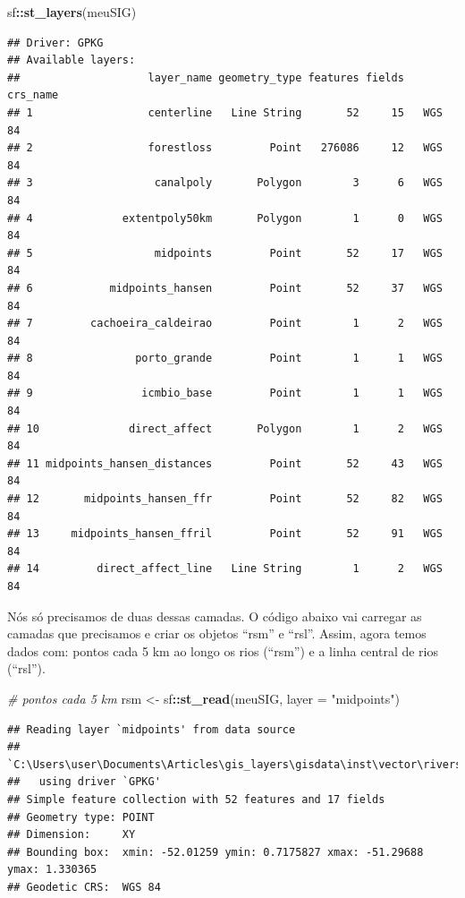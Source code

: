 \documentclass[
]{article}
\newenvironment{Shaded}{\begin{snugshade}}{\end{snugshade}}
\newcommand{\AttributeTok}[1]{\textcolor[rgb]{0.13,0.29,0.53}{#1}}
\newcommand{\CommentTok}[1]{\textcolor[rgb]{0.56,0.35,0.01}{\textit{#1}}}
\newcommand{\FunctionTok}[1]{\textcolor[rgb]{0.13,0.29,0.53}{\textbf{#1}}}
\newcommand{\NormalTok}[1]{#1}
\newcommand{\OtherTok}[1]{\textcolor[rgb]{0.56,0.35,0.01}{#1}}
\newcommand{\SpecialCharTok}[1]{\textcolor[rgb]{0.81,0.36,0.00}{\textbf{#1}}}
\newcommand{\StringTok}[1]{\textcolor[rgb]{0.31,0.60,0.02}{#1}}
\begin{document}
\begin{Shaded}
\begin{Highlighting}[]
\NormalTok{sf}\SpecialCharTok{::}\FunctionTok{st\_layers}\NormalTok{(meuSIG)}
\end{Highlighting}
\end{Shaded}

\begin{verbatim}
## Driver: GPKG 
## Available layers:
##                    layer_name geometry_type features fields crs_name
## 1                  centerline   Line String       52     15   WGS 84
## 2                  forestloss         Point   276086     12   WGS 84
## 3                   canalpoly       Polygon        3      6   WGS 84
## 4              extentpoly50km       Polygon        1      0   WGS 84
## 5                   midpoints         Point       52     17   WGS 84
## 6            midpoints_hansen         Point       52     37   WGS 84
## 7         cachoeira_caldeirao         Point        1      2   WGS 84
## 8                porto_grande         Point        1      1   WGS 84
## 9                 icmbio_base         Point        1      1   WGS 84
## 10              direct_affect       Polygon        1      2   WGS 84
## 11 midpoints_hansen_distances         Point       52     43   WGS 84
## 12       midpoints_hansen_ffr         Point       52     82   WGS 84
## 13     midpoints_hansen_ffril         Point       52     91   WGS 84
## 14         direct_affect_line   Line String        1      2   WGS 84
\end{verbatim}

\newpage

Nós só precisamos de duas dessas camadas. O código abaixo vai carregar as camadas que precisamos e criar os objetos ``rsm'' e ``rsl''. Assim, agora temos dados com: pontos cada 5 km ao longo os rios (``rsm'') e a linha central de rios (``rsl'').

\begin{Shaded}
\begin{Highlighting}[]
\CommentTok{\# pontos cada 5 km}
\NormalTok{rsm }\OtherTok{\textless{}{-}}\NormalTok{ sf}\SpecialCharTok{::}\FunctionTok{st\_read}\NormalTok{(meuSIG, }\AttributeTok{layer =} \StringTok{"midpoints"}\NormalTok{)}
\end{Highlighting}
\end{Shaded}

\begin{verbatim}
## Reading layer `midpoints' from data source 
##   `C:\Users\user\Documents\Articles\gis_layers\gisdata\inst\vector\rivers.gpkg' 
##   using driver `GPKG'
## Simple feature collection with 52 features and 17 fields
## Geometry type: POINT
## Dimension:     XY
## Bounding box:  xmin: -52.01259 ymin: 0.7175827 xmax: -51.29688 ymax: 1.330365
## Geodetic CRS:  WGS 84
\end{verbatim}
\end{document}
